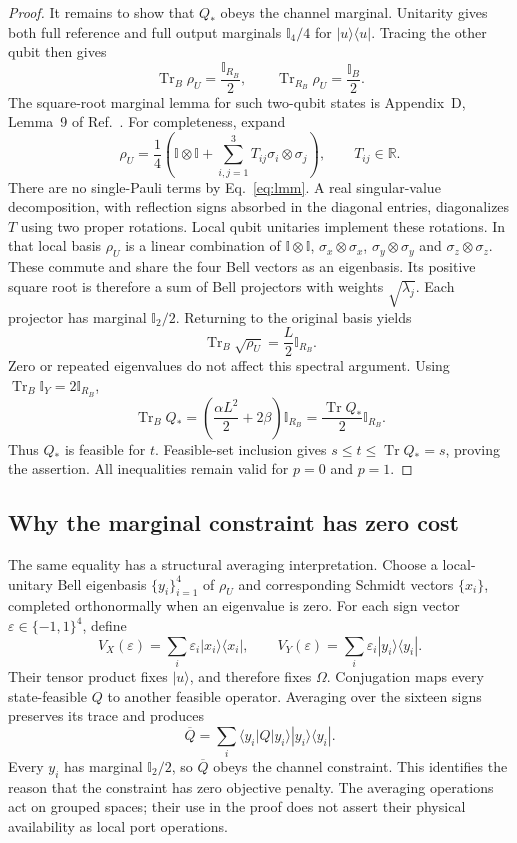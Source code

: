 \documentclass[11pt]{article}
\newcommand{\Tr}{\operatorname{Tr}}
\newcommand{\I}{\mathbb{I}}
\newcommand{\ket}[1]{|#1\rangle}
\newcommand{\bra}[1]{\langle#1|}
\begin{document}
\begin{proof}
It remains to show that $Q_*$ obeys the channel marginal.
Unitarity gives both full reference and full output marginals
$\I_4/4$ for $\ket u\bra u$.
Tracing the other qubit then gives
\begin{equation}
 \Tr_B\rho_U=\frac{\I_{R_B}}2,\qquad
 \Tr_{R_B}\rho_U=\frac{\I_B}2.
 \label{eq:lmm}
\end{equation}
The square-root marginal lemma for such two-qubit states is
Appendix~D, Lemma~9 of Ref.~\cite{Badhani2026}.
For completeness, expand
\[
 \rho_U=\frac14\left(\I\otimes\I+
       \sum_{i,j=1}^3 T_{ij}\sigma_i\otimes\sigma_j\right),
 \qquad T_{ij}\in\mathbb R.
\]
There are no single-Pauli terms by Eq.~\eqref{eq:lmm}.
A real singular-value decomposition, with reflection signs absorbed
in the diagonal entries, diagonalizes $T$ using two proper rotations.
Local qubit unitaries implement these rotations.
In that local basis $\rho_U$ is a linear combination of
$\I\otimes\I$, $\sigma_x\otimes\sigma_x$,
$\sigma_y\otimes\sigma_y$ and $\sigma_z\otimes\sigma_z$.
These commute and share the four Bell vectors as an eigenbasis.
Its positive square root is therefore a sum of Bell projectors with
weights $\sqrt{\lambda_j}$. Each projector has marginal $\I_2/2$.
Returning to the original basis yields
\begin{equation}
 \Tr_B\sqrt{\rho_U}=\frac L2\I_{R_B}.
 \label{eq:sqrt}
\end{equation}
Zero or repeated eigenvalues do not affect this spectral argument.
Using $\Tr_B\I_Y=2\I_{R_B}$,
\[
 \Tr_B Q_*=\left(\frac{\alpha L^2}{2}+2\beta\right)\I_{R_B}
          =\frac{\Tr Q_*}{2}\I_{R_B}.
\]
Thus $Q_*$ is feasible for $t$. Feasible-set inclusion gives
$s\leq t\leq\Tr Q_*=s$, proving the assertion.
All inequalities remain valid for $p=0$ and $p=1$.
\end{proof}

\subsection{Why the marginal constraint has zero cost}
The same equality has a structural averaging interpretation.
Choose a local-unitary Bell eigenbasis $\{y_i\}_{i=1}^4$ of $\rho_U$
and corresponding Schmidt vectors $\{x_i\}$, completed orthonormally
when an eigenvalue is zero. For each sign vector
$\varepsilon\in\{-1,1\}^4$, define
\[
 V_X(\varepsilon)=\sum_i\varepsilon_i\ket{x_i}\bra{x_i},
 \qquad
 V_Y(\varepsilon)=\sum_i\varepsilon_i\ket{y_i}\bra{y_i}.
\]
Their tensor product fixes $\ket u$, and therefore fixes $\Omega$.
Conjugation maps every state-feasible $Q$ to another feasible operator.
Averaging over the sixteen signs preserves its trace and produces
\[
 \overline Q=\sum_i\bra{y_i}Q\ket{y_i}\ket{y_i}\bra{y_i}.
\]
Every $y_i$ has marginal $\I_2/2$, so $\overline Q$ obeys
the channel constraint. This identifies the reason that the constraint
has zero objective penalty. The averaging operations act on grouped
spaces; their use in the proof does not assert their physical
availability as local port operations.
\end{document}
